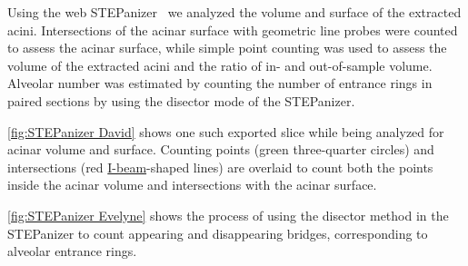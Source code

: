 \documentclass[a4paper,DIVcalc,abstract,english]{scrartcl}
\begin{document}
Using the web STEPanizer~\cite[available free of charge at \url{http://stepanizer.com}]{Tschanz2011} we analyzed the volume and surface of the extracted acini.
Intersections of the acinar surface with geometric line probes were counted to assess the acinar surface, while simple point counting was used to assess the volume of the extracted acini and the ratio of in- and out-of-sample volume. Alveolar number was estimated by counting the number of entrance rings in paired sections by using the disector mode of the STEPanizer.

\autoref{fig:STEPanizer David} shows one such exported slice while being analyzed for acinar volume and surface. 
Counting points (green three-quarter circles) and intersections (red \href{https://encrypted.google.com/search?q=i-beam&tbm=isch}{I-beam}-shaped lines) are overlaid to count both the points inside the acinar volume and intersections with the acinar surface.

\autoref{fig:STEPanizer Evelyne} shows the process of using the disector method in the STEPanizer to count appearing and disappearing bridges, corresponding to alveolar entrance rings.
\end{document}
